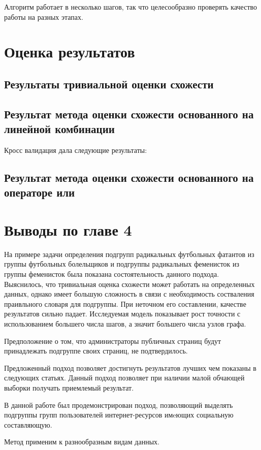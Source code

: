 \documentclass[annotation,times,page4]{itmo-student-thesis}
\begin{document}
Алгоритм работает в несколько шагов, так что целесообразно проверять качество работы на разных этапах.
\section{Оценка результатов}
\subsection{Результаты тривиальной оценки схожести}
\subsection{Результат метода оценки схожести основанного на линейной комбинации}
Кросс валидация дала следующие результаты:
\subsection{Результат метода оценки схожести основанного на операторе или}
\section{Выводы по главе 4}
На примере задачи определения подгрупп радикальных футбольных фатантов из группы футбольных болельщиков и подгруппы радикальных феменисток из группы феменисток была показана состоятельность данного подхода. Выяснилось, что тривиальная оценка схожести может работать на определенных данных, однако имеет большую сложность в связи с необходимость состваления праивльного словаря для подгруппы. При неточном его составлении, качестве результатов сильно падает. Исследуемая модель показывает рост точности с использованием большего числа шагов, а значит большего числа узлов графа. 

Предположение о том, что администраторы публичных страниц будут принадлежать подгруппе своих страниц, не подтвердилось. 

Предложенный подход позволяет достигнуть результатов лучших чем показаны в следующих статьях. Данный подход позволяет при наличии малой обчающей выборки получать приемлемый результат.

\chapterconclusion

\startconclusionpage

В данной работе был продемонстрирован подход, позволяющий выделять подгруппы групп пользователей интернет-ресурсов имeющих социальную составляющую.

Метод применим к разнообразным видам данных.
\end{document}
